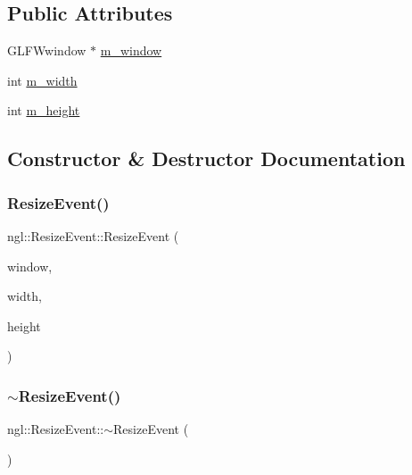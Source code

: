 \subsection*{Public Attributes}
\begin{DoxyCompactItemize}
\item 
G\+L\+F\+Wwindow $\ast$ \mbox{\hyperlink{structngl_1_1_resize_event_a20173a97b7df01f55bece9fd8b985ce1}{m\+\_\+window}}
\item 
int \mbox{\hyperlink{structngl_1_1_resize_event_a2fa3768e603e8b55130e85786fed2e79}{m\+\_\+width}}
\item 
int \mbox{\hyperlink{structngl_1_1_resize_event_aa87e81e4929d1c53102e33d2bebfc7d2}{m\+\_\+height}}
\end{DoxyCompactItemize}


\subsection{Constructor \& Destructor Documentation}
\mbox{\label{structngl_1_1_resize_event_a22840f56fde30d177d74b02f0b98982b}} 
\subsubsection{\texorpdfstring{Resize\+Event()}{ResizeEvent()}}
{\footnotesize\ttfamily ngl\+::\+Resize\+Event\+::\+Resize\+Event (\begin{DoxyParamCaption}\item[{G\+L\+F\+Wwindow $\ast$}]{window,  }\item[{const int}]{width,  }\item[{const int}]{height }\end{DoxyParamCaption})}

\mbox{\label{structngl_1_1_resize_event_aee919bebf61e366131b5168be5c0db7d}} 
\subsubsection{\texorpdfstring{$\sim$\+Resize\+Event()}{~ResizeEvent()}}
{\footnotesize\ttfamily ngl\+::\+Resize\+Event\+::$\sim$\+Resize\+Event (\begin{DoxyParamCaption}{ }\end{DoxyParamCaption})}




